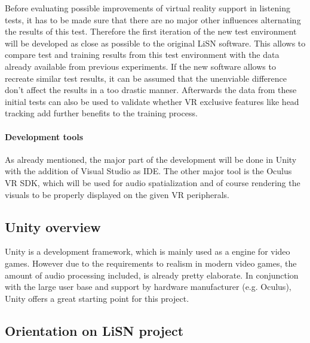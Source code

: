 \documentclass[a4paper,11pt]{article}%
\renewcommand{\\}{\vspace*{0.5\baselineskip} \newline}
\begin{document}
Before evaluating possible improvements of virtual reality support in listening tests, it has to be made sure that there are no major other influences alternating the results of this test. Therefore the first iteration of the new test environment will be developed as close as possible to the original \ac{LiSN} software. This allows to compare test and training results from this test environment with the data already available from previous experiments. If the new software allows to recreate similar test results, it can be assumed that the unenviable difference don't affect the results in a too drastic manner. Afterwards the data from these initial tests can also be used to validate whether VR exclusive features like head tracking add further benefits to the training process.
\newline
\newline



\paragraph{Development tools} As already mentioned, the major part of the development will be done in Unity with the addition of Visual Studio as IDE. The other major tool is the Oculus VR SDK, which will be used for audio spatialization and of course rendering the visuals to be properly displayed on the given VR peripherals.



\subsection{Unity overview}
\label{sec:unity}
Unity is a development framework, which is mainly used as a engine for video games. However due to the requirements to realism in modern video games, the amount of audio processing included, is already pretty elaborate. In conjunction with the large user base and support by hardware manufacturer (e.g. Oculus), Unity offers a great starting point for this project.


\subsection{Orientation on LiSN project}
\end{document}
